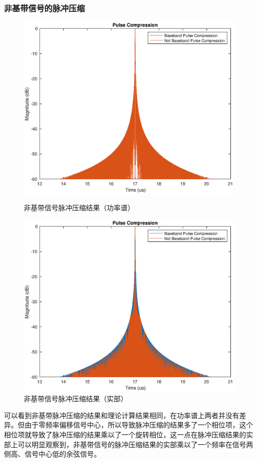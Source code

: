 \subsubsection{非基带信号的脉冲压缩}
\begin{figure}[H]
	\centering
	\begin{minipage}{0.45\linewidth}
		\includegraphics[width=\linewidth]{figure/NotBasebandPulseCompression.eps}
		\caption{非基带信号脉冲压缩结果（功率谱）}
	\end{minipage}
	\begin{minipage}{0.45\linewidth}
		\includegraphics[width=\linewidth]{figure/NotBasebandPulseCompression_real.eps}
		\caption{非基带信号脉冲压缩结果（实部）}
	\end{minipage}
\end{figure}
可以看到非基带脉冲压缩的结果和理论计算结果相同，在功率谱上两者并没有差异。但由于零频率偏移信号中心，所以导致脉冲压缩的结果多了一个相位项，这个相位项就导致了脉冲压缩的结果乘以了一个旋转相位，这一点在脉冲压缩结果的实部上可以明显观察到，非基带信号的脉冲压缩结果的实部乘以了一个频率在信号两侧高、信号中心低的余弦信号。
